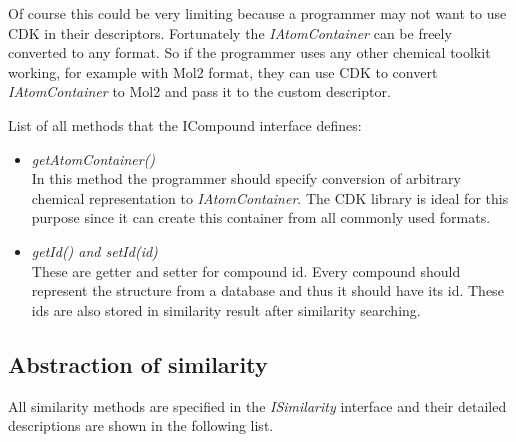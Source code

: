 \documentclass[thesis=M,english]{FITthesis}[2012/10/20]
\begin{document}
Of course this could be very limiting because a programmer may not want to use CDK in their descriptors. Fortunately the \textit{IAtomContainer} can be freely converted to any format. So if the programmer uses any other chemical toolkit working, for example with Mol2 format\cite{mol2}, they can use CDK to convert \textit{IAtomContainer} to Mol2 and pass it to the custom descriptor.

List of all methods that the ICompound interface defines:

\begin{itemize}
\item \textit{getAtomContainer()} \\ In this method the programmer should specify conversion of arbitrary chemical representation to \textit{IAtomContainer}. The CDK library is ideal for this purpose since it can create this container from all commonly used formats.
\item \textit{getId() and setId(id)}  \\ These are getter and setter for compound id. Every compound should represent the structure from a database and thus it should have its id. These ids are also stored in similarity result after similarity searching.
\end{itemize}


\subsection{Abstraction of similarity}
\label{similarityAbstractRef}
All similarity methods are specified in the \textit{ISimilarity} interface and their detailed descriptions are shown in the following list. 
\end{document}
